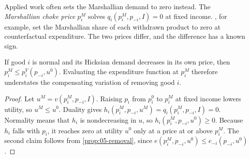 Applied work often sets the Marshallian demand to zero instead. The \emph{Marshallian choke price} $p_i^M$
solves $q_i(p_i^M,p_{-i},I) = 0$ at fixed income. , for example,
set the Marshallian share of each withdrawn product to zero at counterfactual expenditure. The two prices differ,
and the difference has a known sign.

\begin{lemma}\label{lem:05-choke-order}
If good $i$ is normal and its Hicksian demand decreases in its own price, then
$p_i^M \le p_i^V(p_{-i},u^0)$. Evaluating the expenditure function at $p_i^M$ therefore understates the
compensating variation of removing good $i$.
\end{lemma}

\begin{proof}
Let $u^M = v(p_i^M,p_{-i},I)$. Raising $p_i$ from $p_i^0$ to $p_i^M$ at fixed income lowers utility, so
$u^M \le u^0$. Duality gives $h_i(p_i^M,p_{-i},u^M) = q_i(p_i^M,p_{-i},I) = 0$. Normality means that $h_i$ is
nondecreasing in $u$, so $h_i(p_i^M,p_{-i},u^0) \ge 0$. Because $h_i$ falls with $p_i$, it reaches zero at
utility $u^0$ only at a price at or above $p_i^M$. The second claim follows from
\cref{prop:05-removal}, since $e(p_i^M,p_{-i},u^0) \le e_{-i}(p_{-i},u^0)$.
\end{proof}

